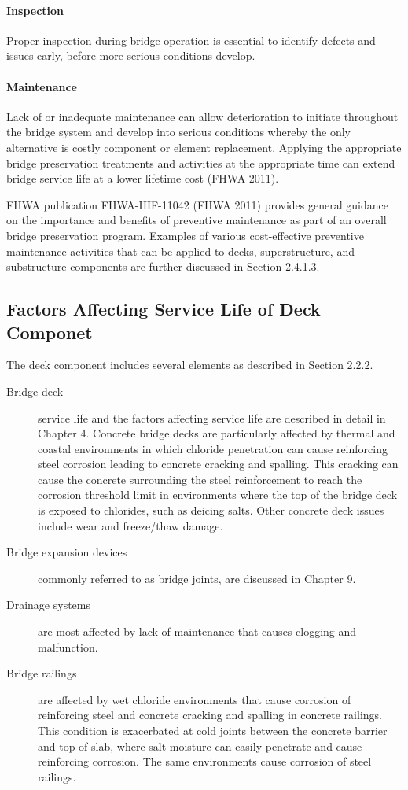 \paragraph{Inspection}
Proper inspection during bridge operation is essential to identify defects and issues early, before more serious
conditions develop.

\paragraph{Maintenance}
Lack of or inadequate maintenance can allow deterioration to initiate throughout the bridge system and develop
into serious conditions whereby the only alternative is costly component or element replacement. Applying the
appropriate bridge preservation treatments and activities at the appropriate time can extend bridge service life at a
lower lifetime cost (FHWA 2011).

FHWA publication FHWA-HIF-11042 (FHWA 2011) provides general guidance on the importance and benefits
of preventive maintenance as part of an overall bridge preservation program. Examples of various cost-effective
preventive maintenance activities that can be applied to decks, superstructure, and substructure components are
further discussed in Section 2.4.1.3.

\subsection{Factors Affecting Service Life of Deck Componet}\label{subsec:factors-affect-deck}
The deck component includes several elements as described in Section 2.2.2.

\begin{description}
  \item [Bridge deck] service life and the factors affecting service life are described in detail in Chapter 4. Concrete
  bridge decks are particularly affected by thermal and coastal environments in which chloride penetration can cause
  reinforcing steel corrosion leading to concrete cracking and spalling. This cracking can cause the concrete
  surrounding the steel reinforcement to reach the corrosion threshold limit in environments where the top of the bridge
  deck is exposed to chlorides, such as deicing salts. Other concrete deck issues include wear and freeze/thaw damage.
  \item [Bridge expansion devices] commonly referred to as bridge joints, are discussed in Chapter 9.
  \item [Drainage systems] are most affected by lack of maintenance that causes clogging and malfunction.
  \item [Bridge railings] are affected by wet chloride environments that cause corrosion of reinforcing steel and concrete
  cracking and spalling in concrete railings. This condition is exacerbated at cold joints between the concrete barrier
  and top of slab, where salt moisture can easily penetrate and cause reinforcing corrosion. The same environments
  cause corrosion of steel railings.
\end{description}

